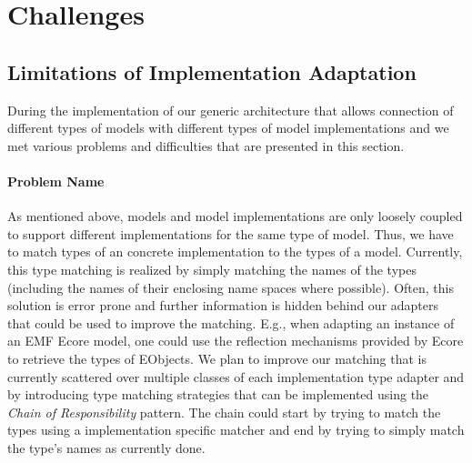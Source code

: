 \section{Challenges}

\subsection{Limitations of Implementation Adaptation}
	 During the implementation of our
	generic architecture that allows connection of different types of models 
	with different types of model implementations and  we met various problems and
	difficulties that are presented in this section. 

	\paragraph{Problem Name}
	As mentioned above, models and model implementations are only loosely 
	coupled to support different implementations for the same type of model.
	 Thus, we have to match types of an concrete implementation to
	the types of a model. Currently, this type matching is realized by simply 
	matching the names of the types (including the names of 
	their enclosing name spaces where possible). Often, this solution is error 
	prone and further information is hidden behind our adapters that could be 
	used to improve the matching. E.g., when adapting an instance of an EMF 
	Ecore model, one could use the reflection mechanisms provided by Ecore to
	retrieve the types of EObjects. We plan to improve our matching
	that is currently scattered over multiple classes of each implementation type 
	adapter and by introducing type matching strategies that 
	can be implemented using the \emph{Chain of Responsibility} 
	pattern\cite{gamma:dp}. The chain could start by trying to match the 
	types using a implementation specific matcher and end by trying to 
	simply match the type's names as currently done.
	
